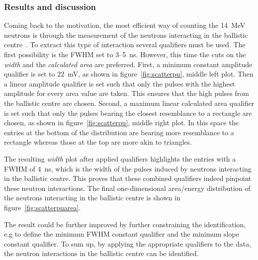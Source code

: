 \subsubsection{Results and discussion}
Coming back to the motivation, the most efficient way of counting the 14~MeV neutrons is through the measurement of the neutrons interacting in the ballistic centre~\cite{PAVEL:00001, CHRISSI:00005}. To extract this type of interaction several qualifiers must be used. The first possibility is the FWHM set to 3--5~ns. However, this time the cuts on the \emph{width} and the \emph{calculated area} are preferred. First, a minimum constant amplitude qualifier is set to 22~mV, as shown in figure~\ref{fig:scatterpu}, middle left plot. Then a linear amplitude qualifier is set such that only the pulses with the highest amplitude for every area value are taken. This ensures that the high pulses from the ballistic centre are chosen. Second, a maximum linear calculated area qualifier is set such that only the pulses bearing the closest resemblance to a rectangle are chosen, as shown in figure~\ref{fig:scatterpu}, middle right plot. In this space the entries at the bottom of the distribution are bearing more resemblance to a rectangle whereas those at the top are more akin to triangles.

The resulting \emph{width} plot after applied qualifiers highlights the entries with a FWHM of 4~ns, which is the width of the pulses induced by neutrons interacting in the ballistic centre. This proves that these combined qualifiers indeed pinpoint these neutron interactions. The final one-dimensional area/energy distribution of the neutrons interacting in the ballistic centre is shown in figure~\ref{fig:scatterpuarea}. 

The result could be further improved by further constraining the identification, e.g to define the minimum FWHM constant qualifier and the minimum slope constant qualifier. To sum up, by applying the appropriate qualifiers to the data, the neutron interactions in the ballistic centre can be identified.






